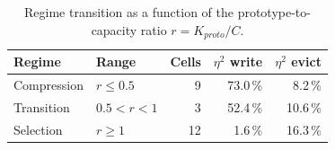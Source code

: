 \begin{table}[t]
\centering
\caption{Regime transition as a function of the prototype-to-capacity ratio $r = K_{proto}/C$.}
\label{tab:regimes}
\begin{tabular}{llrrr}
\hline
Regime & Range & Cells & $\eta^2$ write & $\eta^2$ evict \\
\hline
Compression & $r \leq  0.5$ & 9 & 73.0\,\% & 8.2\,\% \\
Transition & $0.5 < r < 1$ & 3 & 52.4\,\% & 10.6\,\% \\
Selection & $r \geq  1$ & 12 & 1.6\,\% & 16.3\,\% \\
\hline
\end{tabular}
\end{table}
